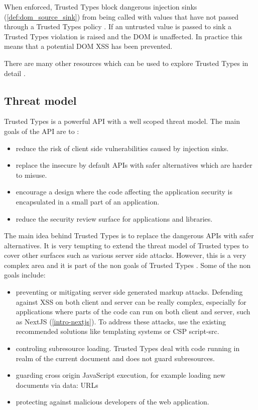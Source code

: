 When enforced, Trusted Types block dangerous injection sinks (\ref{def:dom_source_sink}) from being
called with values that have not passed through a Trusted Types policy \cite{tt_background}. If an
untrusted value is passed to sink a Trusted Types violation is raised and the DOM is unaffected. In
practice this means that a potential DOM XSS has been prevented.

There are many other resources which can be used to explore Trusted Types in detail
\cite{tt_resources}.

\subsection{Threat model}

Trusted Types is a powerful API with a well scoped threat model. The main goals of the API are to
\cite{tt_spec:goals}:

\begin{itemize}
  \item reduce the risk of client side vulnerabilities caused by injection sinks.
  \item replace the insecure by default APIs with safer alternatives which are harder to misuse.
  \item encourage a design where the code affecting the application security is encapsulated in a
        small part of an application.
  \item reduce the security review surface for applications and libraries.
\end{itemize}

The main idea behind Trusted Types is to replace the dangerous APIs with safer alternatives. It is
very tempting to extend the threat model of Trusted types to cover other surfaces such as various
server side attacks. However, this is a very complex area and it is part of the non goals of Trusted
Types \cite{tt_spec:non_goals}. Some of the non goals include:

\begin{itemize}
  \item preventing or mitigating server side generated markup attacks. Defending against XSS on both
        client and server can be really complex, especially for applications where parts of the code
        can run on both client and server, such as NextJS (\ref{intro-nextjs}). To address these
        attacks, use the existing recommended solutions like templating systems or CSP script-src.
  \item controling subresource loading. Trusted Types deal with code running in realm of the current
        document and does not guard subresources.
  \item guarding cross origin JavaScript execution, for example loading new documents via data: URLs
  \item protecting against malicious developers of the web application.
\end{itemize}


